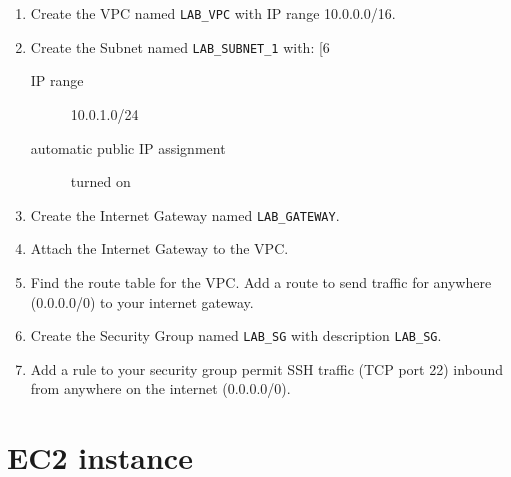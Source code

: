 \documentclass{pgnotes}
\begin{document}
\begin{enumerate}

\item 
  Create the VPC named \texttt{LAB\_VPC} with IP range 10.0.0.0/16.

\item
  Create the Subnet named \texttt{LAB\_SUBNET\_1} with:
[6~  \begin{description}
  \item[IP range] 10.0.1.0/24
  \item[automatic public IP assignment] turned on
  \end{description}
  
\item
  Create the Internet Gateway named \texttt{LAB\_GATEWAY}.

\item
  Attach the Internet Gateway to the VPC.

\item
  Find the route table for the VPC.
  Add a route to send traffic for anywhere (0.0.0.0/0) to your internet gateway.

\item
  Create the Security Group named \texttt{LAB\_SG} with description \texttt{LAB\_SG}.

\item 
  Add a rule to your security group permit SSH traffic (TCP port 22) inbound from anywhere on the internet (0.0.0.0/0).
  
\end{enumerate}

\section{EC2 instance}
\end{document}
